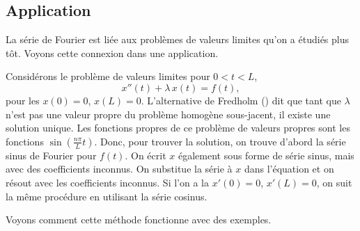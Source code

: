 \subsection{Application}

La série de Fourier est liée aux problèmes de valeurs limites
qu'on a étudiés plus tôt. Voyons cette connexion dans une application.

Considérons le problème de valeurs limites pour $0 < t < L$,
\begin{equation*}
x''(t) + \lambda\, x(t) = f(t) ,
\end{equation*}
pour les \emph{} $x(0) = 0$, $x(L) = 0$.
L'alternative de Fredholm () dit que tant que $\lambda$ n'est pas une valeur propre du problème homogène sous-jacent, il existe une solution unique.
Les fonctions propres de ce problème de valeurs propres sont les fonctions
$\sin \left( \frac{n \pi}{L} t \right)$.
Donc, pour trouver la solution, on trouve d'abord la série sinus de Fourier pour $ f (t) $.
On écrit $x$ également sous forme de série sinus, mais avec des coefficients inconnus.
On substitue la série à $x$ dans l'équation et on résout avec les coefficients inconnus.
Si l'on a la \emph{} $x'(0) = 0$, $x'(L) = 0$, on suit la même procédure en utilisant la série cosinus.

Voyons comment cette méthode fonctionne avec des exemples.

